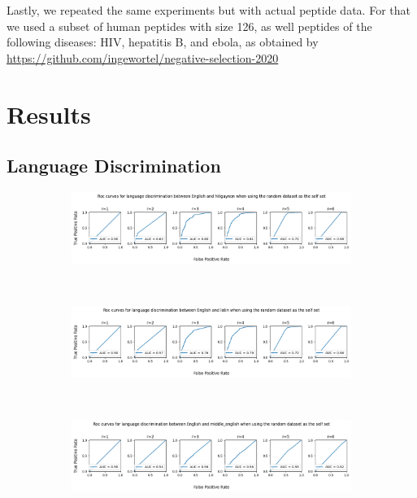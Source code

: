 \documentclass{article}
\begin{document}
Lastly, we repeated the same experiments but with actual peptide data. For that we used a subset of human peptides with 
size 126, as well peptides of the following diseases: HIV, hepatitis B, and ebola, as obtained by \url{https://github.com/ingewortel/negative-selection-2020}



\section{Results}
\subsection{Language Discrimination}
\begin{figure}[ht]
    \begin{subfigure}[t]{\linewidth}
        \centering
        \includegraphics[width=\linewidth]{images/english_hiligayon_random.png}
        \label{fig:eng_hil_rnd}
    \end{subfigure}
    \\
    \begin{subfigure}[t]{\linewidth}
        \centering
        \includegraphics[width=\linewidth]{images/english_latin_random.png}
        \label{fig:eng_lat_rnd}
    \end{subfigure}
    \\
    \begin{subfigure}[t]{\linewidth}
        \centering
        \includegraphics[width=\linewidth]{images/english_middle_neglish_random.png}

\end{subfigure}
\end{figure}
\end{document}
